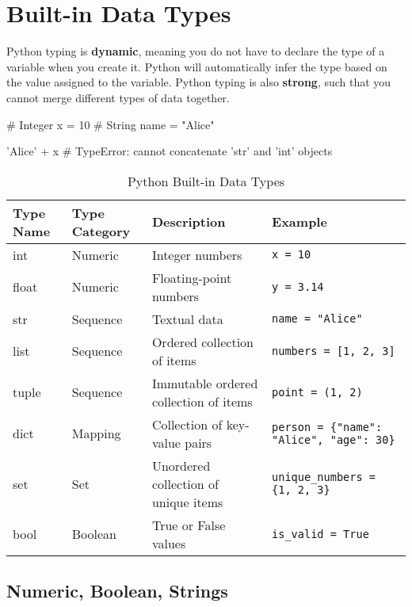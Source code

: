 \section{Built-in Data Types}

Python typing is \textbf{dynamic}, meaning you do not have to declare the type of a variable when you create it. Python will automatically infer the type based on the value assigned to the variable. Python typing is also \textbf{strong}, such that you cannot merge different types of data together.
\begin{codeblock}[language=python]
# Integer
x = 10
# String
name = "Alice"

'Alice' + x # TypeError: cannot concatenate 'str' and 'int' objects
\end{codeblock}

\begin{table}[h!]
    \centering
    \begin{adjustbox}{width=\textwidth} %
    \begin{tabular}{|l|l|p{5cm}|l|}
    \hline
    \textbf{Type Name} & \textbf{Type Category} & \textbf{Description} & \textbf{Example} \\ \hline
    int & Numeric & Integer numbers & \texttt{x = 10} \\ \hline
    float & Numeric & Floating-point numbers & \texttt{y = 3.14} \\ \hline
    str & Sequence & Textual data & \texttt{name = "Alice"} \\ \hline
    list & Sequence & Ordered collection of items & \texttt{numbers = [1, 2, 3]} \\ \hline
    tuple & Sequence & Immutable ordered collection of items & \texttt{point = (1, 2)} \\ \hline
    dict & Mapping & Collection of key-value pairs & \texttt{person = \{"name": "Alice", "age": 30\}} \\ \hline
    set & Set & Unordered collection of unique items & \texttt{unique\_numbers = \{1, 2, 3\}} \\ \hline
    bool & Boolean & True or False values & \texttt{is\_valid = True} \\ \hline
    \end{tabular}
    \end{adjustbox}
    \caption{Python Built-in Data Types}
    \label{tab:data_types}
\end{table}

\subsection{Numeric, Boolean, Strings}

